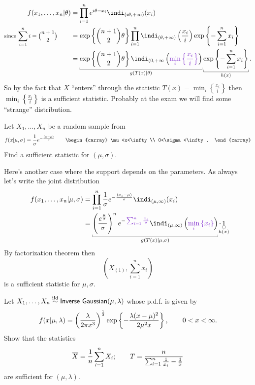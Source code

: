 \begin{align*}
	f(x_{1},\ldots,x_{n}|\theta)&=\prod_{i=1}^{n}e^{i\theta-x_{i}}\indi_{\left(i\theta,+\infty\right)}(x_{i})\\
\text{\footnotesize since $\sum_{i=1}^{n}i={n+1\choose 2}$}\qquad	&=\expg{{n+1\choose 2}\theta}\prod_{i=1}^{n}\indi_{(\theta,+\infty)}\left(\frac{x_{i}}{i}\right)\expg{-\sum_{i=1}^{n}x_{i}}\\
	&=\ubracketthin{\expg{{n+1\choose 2}\theta}\indi_{(0,+\infty}\left(\mathcolor{Purple3}{\min_{i}\left\{\frac{x_{i}}{i}\right\}}\right)}_{g(T(x)|\theta)}\ubracketthin{\expg{-\sum_{i=1}^{n}x_{i}}}_{h(x)}.
\end{align*}
So by the fact that $X$ ``enters'' through the statistic $T(x)=\min_{i}\left\{\frac{x_{i}}{i}\right\}$ then $\min_{i}\left\{\frac{x_{i}}{i}\right\}$ is a sufficient statistic. Probably at the exam we will find some ``strange'' distribution.
\begin{exercise}
	Let $X_{1},\ldots,X_{n}$ be a random sample from 
	\begin{equation*}
		f(x|\mu,\sigma)=\frac{1}{\sigma}e^{-\frac{(x-\mu)}{\sigma}}\qquad\begin{carray}
			\mu<x<\infty\\
			0<\sigma<\infty.
		\end{carray}
	\end{equation*}
	Find a sufficient statistic for $(\mu,\sigma)$.
\end{exercise}
Here's another case where the support depends on the parameters. As always let's write the joint distribution
\begin{align*}
	f(x_{1},\ldots,x_{n}|\mu,\sigma)&=\prod_{i=1}^{n}\frac{1}{\sigma}e^{-\frac{(x_{i}-\mu)}{\sigma}}\indi_{(\mu,\infty)}(x_{i})\\
	&=\ubracketthin{\left(\frac{e^{\frac{\mu}{\sigma}}}{\sigma}\right)^{n}e^{-\mathcolor{Purple3}{\sum_{i=1}^{n}\frac{x_{i}}{\sigma}}}\indi_{(\mu,\infty)}\left(\mathcolor{Purple3}{\min_{i}\left\{x_{i}\right\}}\right)}_{g(T(x)|\mu,\sigma)}\cdot\ubracketthin{ 1}_{\mathclap{h(x)}}
\end{align*}
By factorization theorem then
\begin{equation*}
	\left(X_{(1)},\sum_{i=1}^{n}x_{i}\right)
\end{equation*}
is a sufficient statistic for $\mu,\sigma$.
\begin{exercise}
	Let $X_{1},\ldots,X_{n}\stackrel{\mathrm{iid}}{\sim}\mathsf{Inverse~Gaussian}(\mu,\lambda)$ whose p.d.f. is given by
	\begin{equation*}
		f(x|\mu,\lambda)=\left(\frac{\lambda}{2\pi x^{3}}\right)^{\frac{1}{2}}\exp\left\{-\frac{\lambda (x-\mu)^{2}}{2\mu^{2}x}\right\},\qquad0<x<\infty.
	\end{equation*}
	Show that the statistics
	\begin{equation*}
		\overline{X}=\frac{1}{n}\sum_{i=1}^{n}X_{i};\qquad T=\frac{n}{\sum_{i=1}^{n}\frac{1}{x_{i}}-\frac{1}{\overline{x}}}
	\end{equation*}
	are sufficient for $(\mu,\lambda)$.
\end{exercise}
